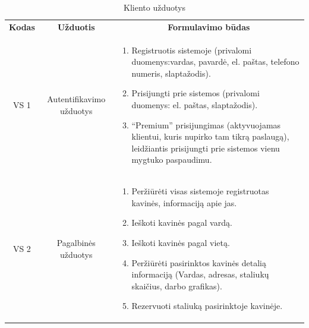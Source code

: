 \documentclass{VUMIFPSkursinis}
\begin{document}
\begin{center}
	\begin{table}[H]
	\caption{Kliento užduotys}
	\begin{tabular}{|p{2cm}|p{}|p{}|}
	\hline
	    \rowcolor{lightgray}
		\multicolumn{3}{|c|}{Kliento užduotys}\\
		
	\hline
		\multicolumn{1}{|c|}{{\bfseries Kodas}}&
		\multicolumn{1}{|c|}{{\bfseries Užduotis}}&
		\multicolumn{1}{|c|}{{\bfseries Formulavimo būdas}}\\		
	\hline
		\multicolumn{1}{|c|}{VS 1}& 	
		\multicolumn{1}{|c|}{Autentifikavimo užduotys}&
		{
			\begin{enumerate}
				\item Registruotis sistemoje
				(privalomi duomenys:vardas, pavardė, el. paštas, telefono numeris, slaptažodis).
				\item Prisijungti prie sistemos (privalomi duomenys: el. paštas, slaptažodis).
				\item “Premium” prisijungimas (aktyvuojamas klientui, kuris nupirko tam tikrą paslaugą), leidžiantis prisijungti prie sistemos vienu mygtuko paspaudimu.
			\end{enumerate}}\\
	
	\hline
		\multicolumn{1}{|c|}{VS 2}&  	
		\multicolumn{1}{|c|}{Pagalbinės užduotys}&
		{
			\begin{enumerate}
				\item Peržiūrėti visas sistemoje registruotas kavinės, informaciją apie jas.
				\item Ieškoti kavinės pagal vardą.
				\item Ieškoti kavinės pagal vietą.
				\item Peržiūrėti pasirinktos kavinės detalią informaciją (Vardas, adresas, staliukų skaičius, darbo grafikas).
				\item Rezervuoti staliuką pasirinktoje kavinėje.
			\end{enumerate}}\\
	
	\hline 	 	
	\end{tabular}

	\label{table:1}
	\end{table}

\end{center}
\end{document}
